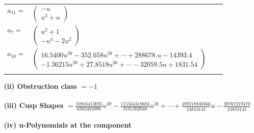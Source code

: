 \documentclass[1p]{elsarticle_modified}
\theoremstyle{definition}
\begin{document}
\begin{tabular}{m{7pt} m{180pt} m{7pt} m{180pt} }
\flushright $a_{11}=$&$\begin{pmatrix}- u\\u^3+u\end{pmatrix}$ \\
\flushright $a_{7}=$&$\begin{pmatrix}u^2+1\\- u^4-2 u^2\end{pmatrix}$ \\
\flushright $a_{10}=$&$\begin{pmatrix}16.5400 u^{39}-352.658 u^{38}+\cdots+288678. u-14393.4\\-1.36215 u^{39}+27.8518 u^{38}+\cdots-32059.5 u+1831.54\end{pmatrix}$\\&\end{tabular}
\flushleft \textbf{(ii) Obstruction class $= -1$}\\~\\
\flushleft \textbf{(iii) Cusp Shapes $= \frac{10816413693}{6362404096} u^{39}-\frac{115564318683}{3181202048} u^{38}+\cdots+\frac{489218830366}{24853141} u-\frac{20767219470}{24853141}$}\\~\\
\newpage\renewcommand{\arraystretch}{1}
\flushleft \textbf{(iv) u-Polynomials at the component}\newline \\
\end{document}
